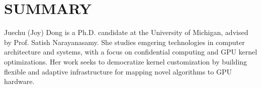 \section{SUMMARY}
Juechu (Joy) Dong is a Ph.D. candidate at the University of Michigan, advised by Prof. Satish Narayanasamy. 
She studies emgering technologies in computer architecture and systems, with a focus on confidential computing and GPU kernel optimizations. Her work seeks to democratize kernel customization by building flexible and adaptive infrastructure for mapping novel algorithms to GPU hardware.